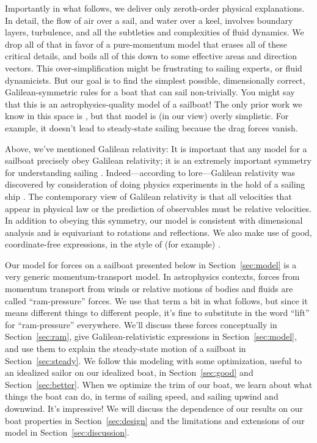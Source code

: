 \documentclass[letterpaper]{article}
\newcommand{\secref}[1]{Section~\ref{#1}}
\begin{document}
Importantly in what follows, we deliver only zeroth-order physical explanations.
In detail, the flow of air over a sail, and water over a keel, involves boundary layers, turbulence, and all the subtleties and complexities of fluid dynamics.
We drop all of that in favor of a pure-momentum model that erases all of these critical details, and boils all of this down to some effective areas and direction vectors.
This over-simplification might be frustrating to sailing experts, or fluid dynamicists.
But our goal is to find the simplest possible, dimensionally correct, Galilean-symmetric rules for a boat that can sail non-trivially.
You might say that this is an astrophysics-quality model of a sailboat!
The only prior work we know in this space is \cite{tao}, but that model is (in our view) overly simplistic.
For example, it doesn't lead to steady-state sailing because the drag forces vanish.

Above, we've mentioned Galilean relativity:
It is important that any model for a sailboat precisely obey Galilean relativity; it is an extremely important symmetry for understanding sailing \cite{symmetry}.
Indeed---according to lore---Galilean relativity was discovered by consideration of doing physics experiments in the hold of a sailing ship \cite{galileo}.
The contemporary view of Galilean relativity is that all velocities that appear in physical law or the prediction of observables must be relative velocities.
In addition to obeying this symmetry, our model is consistent with dimensional analysis and is equivariant to rotations and reflections.
We also make use of good, coordinate-free expressions, in the style of (for example) \cite{kusse}.

Our model for forces on a sailboat presented below in \secref{sec:model} is a very generic momentum-transport model.
In astrophysics contexts, forces from momentum transport from winds or relative motions of bodies and fluids are called ``ram-pressure'' forces.
We use that term a bit in what follows, but since it means different things to different people, it's fine to substitute in the word ``lift'' for ``ram-pressure'' everywhere.
We'll discuss these forces conceptually in \secref{sec:ram}, give Galilean-relativistic expressions in \secref{sec:model}, and use them to explain the steady-state motion of a sailboat in \secref{sec:steady}.
We follow this modeling with some optimization, useful to an idealized sailor on our idealized boat, in \secref{sec:good} and \secref{sec:better}.
When we optimize the trim of our boat, we learn about what things the boat can do, in terms of sailing speed, and sailing upwind and downwind.
It's impressive!
We will discuss the dependence of our results on our boat properties in \secref{sec:design} and the limitations and extensions of our model in \secref{sec:discussion}.
\end{document}
